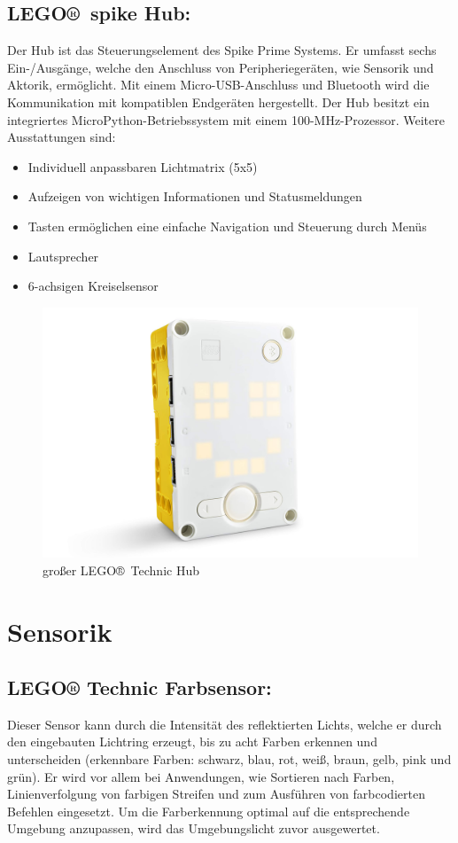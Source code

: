 \subsection*{LEGO® spike Hub:}
Der Hub ist das Steuerungselement des Spike Prime Systems. Er umfasst sechs Ein-/Ausgänge, welche den Anschluss von Peripheriegeräten, wie Sensorik und Aktorik, ermöglicht. Mit einem Micro-USB-Anschluss und Bluetooth wird die Kommunikation mit kompatiblen Endgeräten hergestellt. Der Hub besitzt ein integriertes MicroPython-Betriebssystem mit einem 100-MHz-Prozessor. 
Weitere Ausstattungen sind:
\begin{itemize}
	\item Individuell anpassbaren Lichtmatrix (5x5)
	\item Aufzeigen von wichtigen Informationen und Statusmeldungen
	\item Tasten ermöglichen eine einfache Navigation und Steuerung durch Menüs 
	\item Lautsprecher
	\item 6-achsigen Kreiselsensor
\end{itemize}

\begin{figure}[H]
	\centering
	\includegraphics[width=0.4\linewidth]{images/Hub}
	\caption{großer LEGO® Technic Hub}
	\label{fig:hub}
\end{figure}



\section{Sensorik}
\subsection*{LEGO® Technic Farbsensor:}
Dieser Sensor kann durch die Intensität des reflektierten Lichts, welche er durch den eingebauten Lichtring erzeugt, bis zu acht Farben erkennen und unterscheiden (erkennbare Farben: schwarz, blau, rot, weiß, braun, gelb, pink und grün).  Er wird vor allem bei Anwendungen, wie Sortieren nach Farben, Linienverfolgung von farbigen Streifen und zum Ausführen von farbcodierten Befehlen eingesetzt. Um die Farberkennung optimal auf die entsprechende Umgebung anzupassen, wird das Umgebungslicht zuvor ausgewertet.

